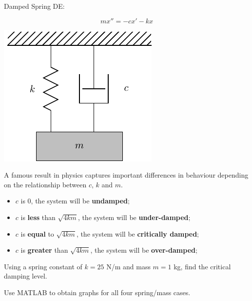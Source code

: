 \begin{minipage}[t]{0.4\linewidth}
\vspace{0pt}
Damped Spring DE:

$$ m x'' = -c x' -kx $$
\end{minipage}
\begin{minipage}[t]{0.6\linewidth}
\vspace{0pt}
\begin{center}
\includegraphics[width=0.5\linewidth]{graphics/notes_08_hanging_mass}
\end{center}
\end{minipage}

\newpage

A famous result in physics captures important differences in behaviour
depending on the relationship between $c$, $k$ and $m$.
\begin{itemize}
\item $c$ is 0, the system will be {\bf undamped};
\item $c$ is {\bf less} than $\sqrt{4km}$, the system will be {\bf under-damped};
\item $c$ is {\bf equal} to $\sqrt{4km}$, the system will be {\bf
    critically damped};
\item $c$ is {\bf greater} than $\sqrt{4km}$, the system will be {\bf
    over-damped};
\end{itemize}

\problem Using a spring constant of $k = 25$ N/m and mass $m = 1$ kg,
find the critical damping level.

\newpage
\problem Use MATLAB to obtain graphs for all four spring/mass cases.

